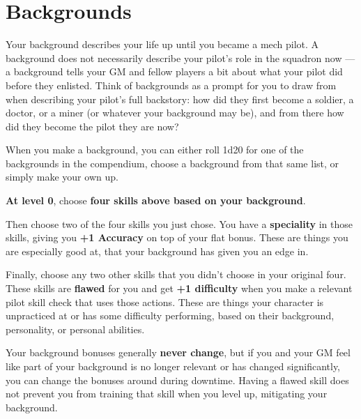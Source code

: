 \section{Backgrounds}

Your background describes your life up until you became a mech pilot. A background does not
necessarily describe your pilot’s role in the squadron now — a background tells your GM and
fellow players a bit about what your pilot did before they enlisted. Think of backgrounds as a
prompt for you to draw from when describing your pilot’s full backstory: how did they first
become a soldier, a doctor, or a miner (or whatever your background may be), and from there
how did they become the pilot they are now?

When you make a background, you can either roll 1d20 for one of the backgrounds in the
compendium, choose a background from that same list, or simply make your own up.

\textbf{At level 0}, choose \textbf{four skills above based on your background}. 

Then choose two of the four skills you just chose. You have a \textbf{speciality} in those skills, giving
you \textbf{+1 Accuracy} on top of your flat bonus. These are things you are especially good at, that
your background has given you an edge in.

Finally, choose any two other skills that you didn’t choose in your original four. These skills are
\textbf{flawed} for you and get \textbf{+1 difficulty} when you make a relevant pilot skill check that uses those
actions. These are things your character is unpracticed at or has some difficulty performing,
based on their background, personality, or personal abilities.

Your background bonuses generally \textbf{never change}, but if you and your GM feel like part of your
background is no longer relevant or has changed significantly, you can change the bonuses
around during downtime. Having a flawed skill does not prevent you from training that skill when
you level up, mitigating your background.